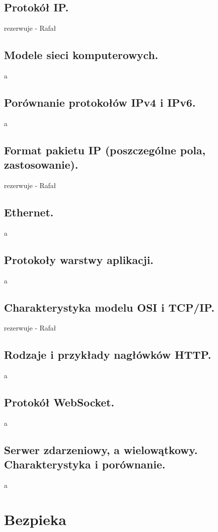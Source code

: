 \documentclass[a4paper,12pt,oneside]{book}
\begin{document}
							
			
			\newpage\subsection{\color{red}Protokół IP.}
				rezerwuje - Rafał
			\newpage\subsection{\color{red}Modele sieci komputerowych.}
				a
			\newpage\subsection{\color{red}Porównanie protokołów IPv4 i IPv6.}
				a
			\newpage\subsection{\color{red}Format pakietu IP (poszczególne pola, zastosowanie).}
				rezerwuje - Rafał
			\newpage\subsection{\color{red}Ethernet.}
				a
			\newpage\subsection{\color{red}Protokoły warstwy aplikacji.}
				a
			\newpage\subsection{\color{red}Charakterystyka modelu OSI i TCP/IP.}
				rezerwuje - Rafał
			\newpage\subsection{\color{red}Rodzaje i przykłady nagłówków HTTP.}
				a
			\newpage\subsection{\color{red}Protokół WebSocket.}
				a
			\newpage\subsection{\color{red}Serwer zdarzeniowy, a wielowątkowy. Charakterystyka i porównanie.}
				a
		
		\newpage\section{Bezpieka}
\end{document}
